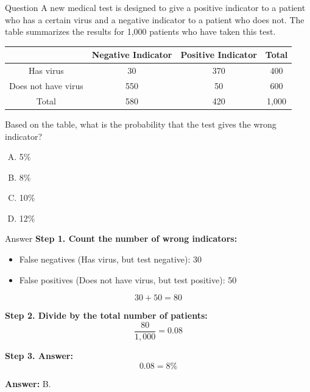 \documentclass{beamer}
\begin{document}
\begin{frame}{Question}
A new medical test is designed to give a positive indicator to a patient who has a certain virus and a negative indicator to a patient who does not. The table summarizes the results for 1,000 patients who have taken this test.

\begin{center}
\begin{tabular}{|c|c|c|c|}
\hline
 & Negative Indicator & Positive Indicator & Total \\
\hline
Has virus & 30 & 370 & 400 \\
Does not have virus & 550 & 50 & 600 \\
\hline
Total & 580 & 420 & 1,000 \\
\hline
\end{tabular}
\end{center}

Based on the table, what is the probability that the test gives the wrong indicator?

\begin{enumerate}[A.]
    \item 5\%
    \item 8\%
    \item 10\%
    \item 12\%
\end{enumerate}
\end{frame}


\begin{frame}{Answer}
\textbf{Step 1. Count the number of wrong indicators:}
\begin{itemize}
    \item False negatives (Has virus, but test negative): 30
    \item False positives (Does not have virus, but test positive): 50
\end{itemize}
\[
30 + 50 = 80
\]

\textbf{Step 2. Divide by the total number of patients:}
\[
\frac{80}{1,000} = 0.08
\]

\textbf{Step 3. Answer:}
\[
0.08 = 8\%
\]

\textbf{Answer:} B.
\end{frame}
\end{document}

